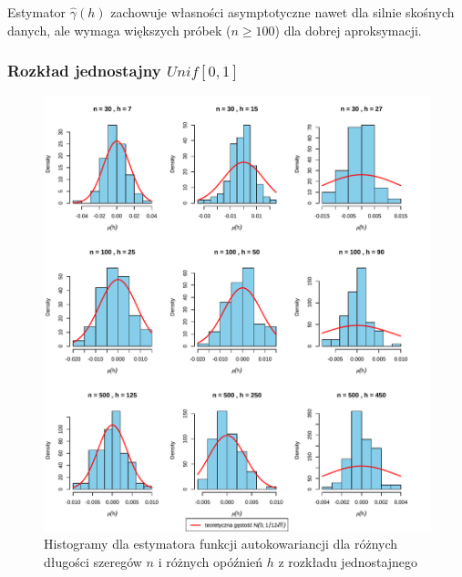 \documentclass[10pt, a4paper]{article}\usepackage[]{graphicx}\usepackage[]{xcolor}
\makeatletter
\def\maxwidth{ %
  \ifdim\Gin@nat@width>\linewidth
    \linewidth
  \else
    \Gin@nat@width
  \fi
}
\newenvironment{knitrout}{}{} %
\makeatother
\begin{document}
Estymator $\hat{\gamma}(h)$ zachowuje własności asymptotyczne nawet dla silnie skośnych danych, ale wymaga większych próbek ($n \geq 100$) dla dobrej aproksymacji.


\subsubsection{Rozkład jednostajny $Unif[0,1]$}


\begin{knitrout}
\color{fgcolor}\begin{figure}[H]

{\centering \includegraphics[width=\maxwidth]{figure/wykresy-gamma-unif-1} 

}

\caption[Histogramy dla estymatora funkcji autokowariancji dla różnych długości szeregów $n$ i różnych opóźnień $h$ z rozkładu jednostajnego]{Histogramy dla estymatora funkcji autokowariancji dla różnych długości szeregów $n$ i różnych opóźnień $h$ z rozkładu jednostajnego}\label{fig:wykresy-gamma-unif}
\end{figure}

\end{knitrout}
\end{document}
